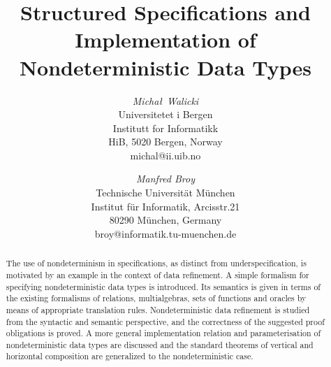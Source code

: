 


\title{Structured Specifications and Implementation of \\ Nondeterministic Data Types}
\author{{\em Micha{\l}\ Walicki} \\
\small Universitetet i Bergen \\[-.5ex] 
\small Institutt for Informatikk \\[-.5ex] 
\small HiB, 5020 Bergen, Norway \\[-.5ex] {\scriptsize michal@ii.uib.no} 
\and {\em Manfred Broy} \\
\small Technische Universit\"{a}t M\"{u}nchen \\[-.5ex] 
\small Institut f\"{u}r Informatik, Arcisstr.21 \\[-.5ex] 
\small 80290 M\"{u}nchen, Germany \\[-.5ex] {\scriptsize broy@informatik.tu-muenchen.de} }
\date{}
\maketitle
\begin{abstract}\noindent The use of nondeterminism in specifications, as distinct from underspecification, is
motivated by an example in the context of data refinement. A simple formalism for specifying nondeterministic data types is introduced. Its semantics is given in terms of the existing formalisms of relations, multialgebras, sets of
functions and oracles by means of appropriate translation rules. Nondeterministic data refinement is studied from the syntactic and semantic perspective, and the correctness of the suggested proof obligations is proved.
A more general implementation relation and parameterisation of nondeterministic data types are discussed and the standard theorems of vertical and horizontal composition are generalized to the
nondeterministic case.
\end{abstract}

